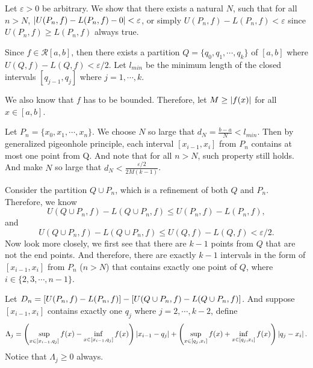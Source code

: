 \documentclass[12pt]{article}
\begin{document}
\begin{fproof}[4(a)]
    Let \(\varepsilon > 0\) be arbitrary.
    We show that there exists a natural \(N\), such that for all \(n > N\), \(\left\lvert U(P_n, f) - L(P_n, f) - 0 \right\rvert < \varepsilon\), or simply \(U(P_n, f) - L(P_n, f) < \varepsilon\) since \(U(P_n, f) \geq L(P_n, f)\) always true.
  
    Since \(f \in \mathcal{R}[a,b]\), then there exists a partition \(Q = \{q_0, q_1, \cdots, q_k\}\) of \([a,b]\) where \(U(Q, f) - L(Q,f) < \varepsilon/2\).
    Let \(l_{min}\) be the minimum length of the closed intervals \([q_{j-1}, q_j]\) where \(j = 1,\cdots,k\).
  
    We also know that \(f\) has to be bounded. Therefore, let \(M \geq \left\lvert f(x) \right\rvert\) for all \(x \in [a,b]\).
  
    Let \(P_n = \{x_0, x_1, \cdots, x_n\}\).
    We choose \(N\) so large that \(d_N = \frac{b-a}{N} < l_{min}\).
    Then by generalized pigeonhole principle, each interval \([x_{i-1}, x_i]\) from \(P_n\) contains at most one point from Q. And note that for all \(n > N\), such property still holds.
    And make \(N\) so large that \(d_N < \frac{\varepsilon/2}{2M(k-1)}\).
  
    Consider the partition \(Q \cup P_n\), which is a refinement of both \(Q\) and \(P_n\). 
    Therefore, we know \[U(Q \cup P_n, f) - L(Q \cup P_n, f) \leq U(P_n, f) - L(P_n, f),\] and \[U(Q \cup P_n, f) - L(Q \cup P_n, f) \leq U(Q, f) - L(Q, f) < \varepsilon/2.\]
    Now look more closely, we first see that there are \(k-1\) points from \(Q\) that are not the end points.
    And therefore, there are exactly \(k-1\) intervals in the form of \([x_{i-1}, x_i]\) from \(P_n\) (\(n > N\)) that contains exactly one point of \(Q\), where \(i \in \{2, 3, \cdots, n-1\}\).
  
    Let \(D_n = \left[ U(P_n,f) - L(P_n, f) \right] - \left[ U(Q \cup P_n, f) - L(Q \cup P_n, f) \right]\).
    And suppose \([x_{i-1}, x_i]\) contains exactly one \(q_j\) where \(j = 2, \cdots, k-2\), define \[\Lambda_j = \left( \sup_{x \in [x_{i-1}, q_j]}f(x) - \inf_{x \in [x_{i-1}, q_j]}f(x) \right)\left\lvert x_{i-1} - q_j \right\rvert + \left( \sup_{x \in [q_j, x_i]}f(x) + \inf_{x \in [q_j, x_i]}f(x) \right)\left\lvert q_j - x_i \right\rvert.\]
    Notice that \(\Lambda_j \geq 0\) always.
    

\end{fproof}
\end{document}
